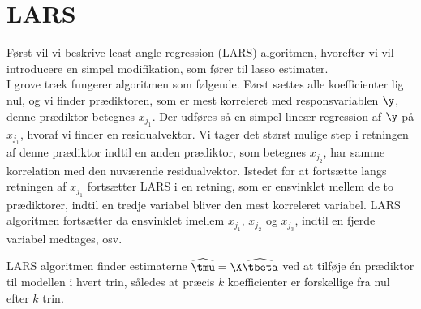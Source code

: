 \section{LARS}
Først vil vi beskrive least angle regression (LARS) algoritmen, hvorefter vi vil introducere en simpel modifikation, som fører til lasso estimater. \\[2mm]
%
I grove træk fungerer algoritmen som følgende. 
Først sættes alle koefficienter lig nul, og vi finder prædiktoren, som er mest korreleret med responsvariablen \(\y\), denne prædiktor betegnes \(x_{j_1}\).
Der udføres så en simpel lineær regression af \(\y\) på \(x_{j_1}\), hvoraf vi finder en residualvektor.
Vi tager det størst mulige step i retningen af denne prædiktor indtil en anden prædiktor, som betegnes  \(x_{j_2}\), har samme korrelation med den nuværende residualvektor.
Istedet for at fortsætte langs retningen af \(x_{j_1}\) fortsætter LARS i en retning, som er ensvinklet mellem de to prædiktorer, indtil en tredje variabel bliver den mest korreleret variabel.
LARS algoritmen fortsætter da ensvinklet imellem \(x_{j_1}\), \(x_{j_2}\) og \(x_{j_3}\), indtil en fjerde variabel medtages, osv.

LARS algoritmen finder estimaterne \(\widehat{\tmu} = \X \widehat{\tbeta}\) ved at tilføje én prædiktor til modellen i hvert trin, således at præcis \(k\) koefficienter er forskellige fra nul efter \(k\) trin.

